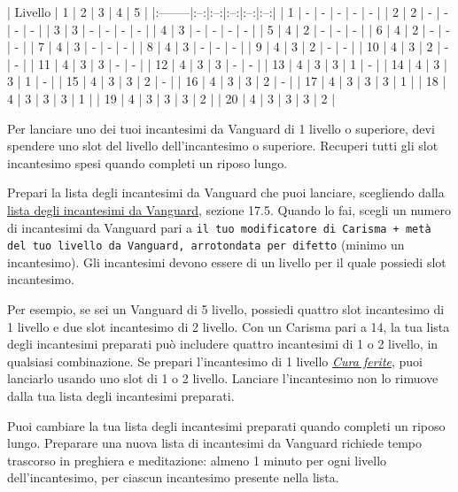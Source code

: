 \documentclass[a4paper,10pt,twoside,twocolumn,openany,bg=full,nodeprecatedcode]{dndbook}
\begin{document}
| Livello | 1\degree{} | 2\degree{} | 3\degree{} | 4\degree{} | 5\degree{} | |:--------|:--:|:--:|:--:|:--:|:--:| |  1\degree{}     |  - |  - |  - |  - |  - | |  2\degree{}     |  2 |  - |  - |  - |  - | |  3\degree{}     |  3 |  - |  - |  - |  - | |  4\degree{}     |  3 |  - |  - |  - |  - | |  5\degree{}     |  4 |  2 |  - |  - |  - | |  6\degree{}     |  4 |  2 |  - |  - |  - | |  7\degree{}     |  4 |  3 |  - |  - |  - | |  8\degree{}     |  4 |  3 |  - |  - |  - | |  9\degree{}     |  4 |  3 |  2 |  - |  - | | 10\degree{}     |  4 |  3 |  2 |  - |  - | | 11\degree{}     |  4 |  3 |  3 |  - |  - | | 12\degree{}     |  4 |  3 |  3 |  - |  - | | 13\degree{}     |  4 |  3 |  3 |  1 |  - | | 14\degree{}     |  4 |  3 |  3 |  1 |  - | | 15\degree{}     |  4 |  3 |  3 |  2 |  - | | 16\degree{}     |  4 |  3 |  3 |  2 |  - | | 17\degree{}     |  4 |  3 |  3 |  3 |  1 | | 18\degree{}     |  4 |  3 |  3 |  3 |  1 | | 19\degree{}     |  4 |  3 |  3 |  3 |  2 | | 20\degree{}     |  4 |  3 |  3 |  3 |  2 |

Per lanciare uno dei tuoi incantesimi da Vanguard di 1\degree{} livello o superiore, devi spendere uno slot del livello dell'incantesimo o superiore. Recuperi tutti gli slot incantesimo spesi quando completi un riposo lungo.

Prepari la lista degli incantesimi da Vanguard che puoi lanciare, scegliendo dalla \hyperref[Vanguard_Spells_vanguard_spells]{lista degli incantesimi da Vanguard}, sezione 17.5. Quando lo fai, scegli un numero di incantesimi da Vanguard pari a \texttt{il tuo modificatore di Carisma + metà del tuo livello da Vanguard, arrotondata per difetto} (minimo un incantesimo). Gli incantesimi devono essere di un livello per il quale possiedi slot incantesimo.

Per esempio, se sei un Vanguard di 5\degree{} livello, possiedi quattro slot incantesimo di 1\degree{} livello e due slot incantesimo di 2\degree{} livello. Con un Carisma pari a 14, la tua lista degli incantesimi preparati può includere quattro incantesimi di 1\degree{} o 2\degree{} livello, in qualsiasi combinazione. Se prepari l'incantesimo di 1\degree{} livello \emph{\hyperref[Cure_Wounds_cure_wounds]{Cura ferite}}, puoi lanciarlo usando uno slot di 1\degree{} o 2\degree{} livello. Lanciare l'incantesimo non lo rimuove dalla tua lista degli incantesimi preparati.

Puoi cambiare la tua lista degli incantesimi preparati quando completi un riposo lungo. Preparare una nuova lista di incantesimi da Vanguard richiede tempo trascorso in preghiera e meditazione: almeno 1 minuto per ogni livello dell'incantesimo, per ciascun incantesimo presente nella lista.
\end{document}
